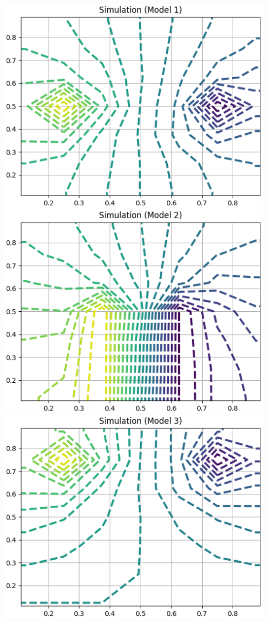 \documentclass[uplatex,a4paper,11pt,oneside,openany]{jsbook}
\begin{document}
\newpage

\includegraphics[scale=0.62]{./figure/simu1.eps}
\vfill
\includegraphics[scale=0.62]{./figure/simu2.eps}
\vfill
\includegraphics[scale=0.62]{./figure/simu3.eps}
\end{document}
